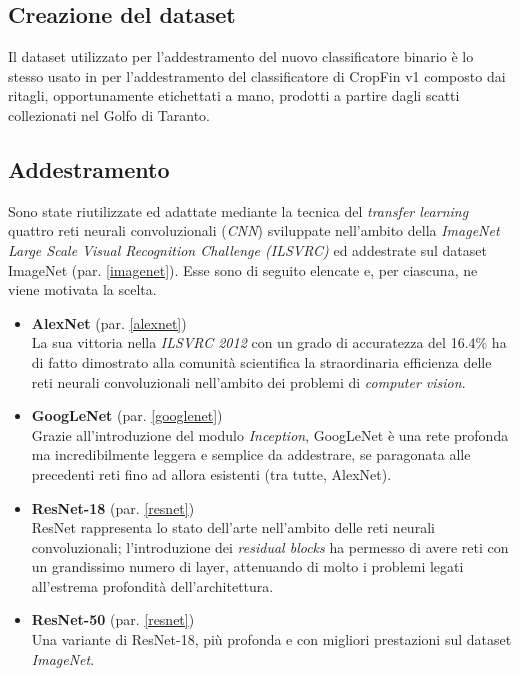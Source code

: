 \subsection{Creazione del dataset}
\label{creazioneDataset}
Il dataset utilizzato per l'addestramento del nuovo classificatore binario è lo stesso usato in \cite{gianvito} per l'addestramento del classificatore di CropFin v1 composto dai ritagli, opportunamente etichettati a mano, prodotti a partire dagli scatti collezionati nel Golfo di Taranto.

\subsection{Addestramento}
Sono state riutilizzate ed adattate mediante la tecnica del \textit{transfer learning} quattro reti neurali convoluzionali (\textit{CNN}) sviluppate nell'ambito della \textit{ImageNet Large Scale Visual Recognition Challenge (ILSVRC)} ed addestrate sul dataset ImageNet (par. \ref{imagenet}). Esse sono di seguito elencate e, per ciascuna, ne viene motivata la scelta.

\begin{itemize}

\item \textbf{AlexNet} (par. \ref{alexnet})\\
La sua vittoria nella \textit{ILSVRC 2012} con un grado di accuratezza del 16.4\% ha di fatto dimostrato alla comunità scientifica la straordinaria efficienza delle reti neurali convoluzionali nell'ambito dei problemi di \textit{computer vision}.

\item \textbf{GoogLeNet} (par. \ref{googlenet})\\
Grazie all'introduzione del modulo \textit{Inception}, GoogLeNet è una rete profonda ma incredibilmente leggera e semplice da addestrare, se paragonata alle precedenti reti fino ad allora esistenti (tra tutte, AlexNet).

\item \textbf{ResNet-18} (par. \ref{resnet})\\
ResNet rappresenta lo stato dell'arte nell'ambito delle reti neurali convoluzionali; l'introduzione dei \textit{residual blocks} ha permesso di avere reti con un grandissimo numero di layer, attenuando di molto i problemi legati all'estrema profondità dell'architettura.

\item \textbf{ResNet-50} (par. \ref{resnet})\\
Una variante di ResNet-18, più profonda e con migliori prestazioni sul dataset \textit{ImageNet}.

\end{itemize}



